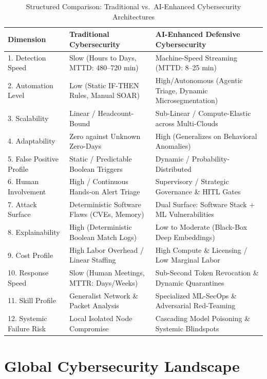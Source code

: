 \documentclass[conference,10pt,twocolumn,a4paper]{IEEEtran}
\begin{document}
\begin{table}[t]
\caption{Structured Comparison: Traditional vs.\ AI-Enhanced Cybersecurity Architectures}
\label{tab:comparison}
\centering
\footnotesize
\setlength{\tabcolsep}{4pt}
\begin{tabular}{lp{6.2cm}p{6.8cm}}
\toprule
\textbf{Dimension} & \textbf{Traditional Cybersecurity} & \textbf{AI-Enhanced Defensive Cybersecurity} \\
\midrule
1. Detection Speed & Slow (Hours to Days, MTTD: 480--720 min) & Machine-Speed Streaming (MTTD: 8--25 min) \\
2. Automation Level & Low (Static IF-THEN Rules, Manual SOAR) & High/Autonomous (Agentic Triage, Dynamic Microsegmentation) \\
3. Scalability & Linear / Headcount-Bound & Sub-Linear / Compute-Elastic across Multi-Clouds \\
4. Adaptability & Zero against Unknown Zero-Days & High (Generalizes on Behavioral Anomalies) \\
5. False Positive Profile & Static / Predictable Boolean Triggers & Dynamic / Probability-Distributed \\
6. Human Involvement & High / Continuous Hands-on Alert Triage & Supervisory / Strategic Governance \& HITL Gates \\
7. Attack Surface & Deterministic Software Flaws (CVEs, Memory) & Dual Surface: Software Stack + ML Vulnerabilities \\
8. Explainability & High (Deterministic Boolean Match Logs) & Low to Moderate (Black-Box Deep Embeddings) \\
9. Cost Profile & High Labor Overhead / Linear Staffing & High Compute \& Licensing / Low Marginal Labor \\
10. Response Speed & Slow (Human Meetings, MTTR: Days/Weeks) & Sub-Second Token Revocation \& Dynamic Quarantines \\
11. Skill Profile & Generalist Network \& Packet Analysis & Specialized ML-SecOps \& Adversarial Red-Teaming \\
12. Systemic Failure Risk & Local Isolated Node Compromise & Cascading Model Poisoning \& Systemic Blindspots \\
\bottomrule
\end{tabular}
\end{table}

\section{Global Cybersecurity Landscape}
\label{sec:global}
\end{document}
